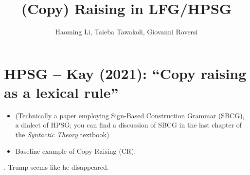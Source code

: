 \documentclass[11pt]{article}
\title{(Copy) Raising in LFG/HPSG}
\author{Haoming Li, Taieba Tawakoli, Giovanni Roversi}
\begin{document}
\maketitle

\section{HPSG – Kay (2021): ``Copy raising as a lexical rule''}
\label{sec:sbcg_a_dialect_of_hpsg}



\begin{itemize}
\item (Technically a paper employing Sign-Based Construction Grammar (SBCG), a dialect of HPSG; you can find a discussion of SBCG in the last chapter of the \textit{Syntactic Theory} textbook)

\item Baseline example of Copy Raising (CR):
\end{itemize}
\ex. Trump seems like he disappeared.
\end{document}

